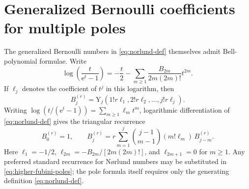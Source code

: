 \documentclass[11pt,a4paper,oneside]{article}
\theoremstyle{definition}
\theoremstyle{remark}
\newcommand{\e}{\mathrm{e}}
\newcommand{\BellY}{\mathrm{Y}}
\begin{document}
\section{Generalized Bernoulli coefficients for multiple poles}
\label{app:norlund}
The generalized Bernoulli numbers in \cref{eq:norlund-def} themselves admit
Bell-polynomial formulae.  Write
\[
 \log\!\left(\frac{t}{\e^t-1}\right)
 =-\frac t2-
 \sum_{m\ge1}\frac{B_{2m}}{2m(2m)!}t^{2m}.
\]
If $\ell_j$ denotes the coefficient of $t^j$ in this logarithm, then
\[
 B_j^{(r)}=
 \BellY_j(1!r\ell_1,2!r\ell_2,\ldots,j!r\ell_j).
\]
Writing
\(
 \log(t/(\e^t-1))=\sum_{m\ge1}\ell_m t^m
\), logarithmic differentiation of \cref{eq:norlund-def} gives the
triangular recurrence
\begin{equation}\label{eq:norlund-recurrence}
 B_0^{(r)}=1,
 \qquad
 B_j^{(r)}=
 r\sum_{m=1}^{j}\binom{j-1}{m-1}
 (m!\ell_m)\,B_{j-m}^{(r)}.
\end{equation}
Here $\ell_1=-1/2$, $\ell_{2m}=-B_{2m}/[2m(2m)!]$, and
$\ell_{2m+1}=0$ for $m\ge1$.  Any preferred standard recurrence for
N\o rlund numbers may be substituted in \cref{eq:higher-fubini-poles}; the
pole formula itself requires only the generating definition
\cref{eq:norlund-def}.
\end{document}
